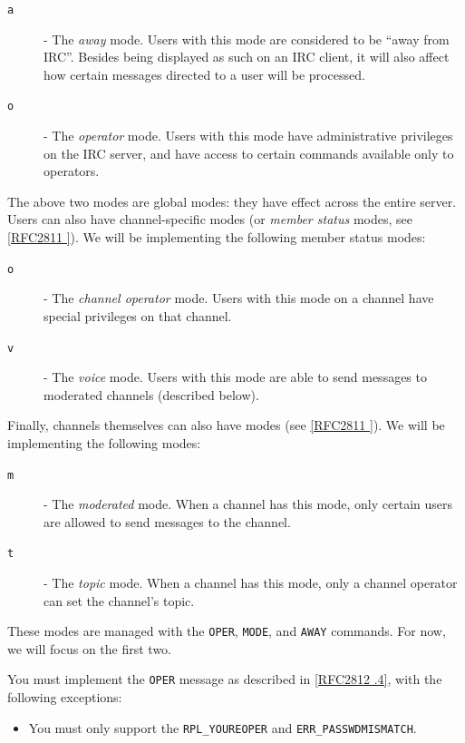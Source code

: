 \documentclass[10pt]{article}
\newcommand{\RFCsection}[2]{\href{http://tools.ietf.org/html/rfc#1\#section-#2}{[RFC#1 \textsection #2]}}
\begin{document}
\begin{description}
\item[\texttt{a}]- The \emph{away} mode. Users with this mode are considered to be ``away from IRC''. Besides being displayed as such on an IRC client, it will also affect how certain messages directed to a user will be processed.
\item[\texttt{o}]- The \emph{operator} mode. Users with this mode have administrative privileges on the IRC server, and have access to certain commands available only to operators.
\end{description}

The above two modes are global modes: they have effect across the entire server. Users can also have channel-specific modes (or \emph{member status} modes, see \RFCsection{2811}{4.1}). We will be implementing the following member status modes:

\begin{description}
\item[\texttt{o}]- The \emph{channel operator} mode. Users with this mode on a channel have special privileges on that channel.
\item[\texttt{v}]- The \emph{voice} mode. Users with this mode are able to send messages to moderated channels (described below).
\end{description}

Finally, channels themselves can also have modes (see \RFCsection{2811}{4}). We will be implementing the following modes:

\begin{description}
\item[\texttt{m}]- The \emph{moderated} mode. When a channel has this mode, only certain users are allowed to send messages to the channel.
\item[\texttt{t}]- The \emph{topic} mode. When a channel has this mode, only a channel operator can set the channel's topic.
\end{description}

These modes are managed with the \texttt{OPER}, \texttt{MODE}, and \texttt{AWAY} commands. For now, we will focus on the first two.

You must implement the \texttt{OPER} message as described in \RFCsection{2812}{3.1.4}, with the following exceptions:

\begin{itemize}
\item You must only support the \texttt{RPL\_YOUREOPER} and \texttt{ERR\_PASSWDMISMATCH}.
\end{itemize}
\end{document}
